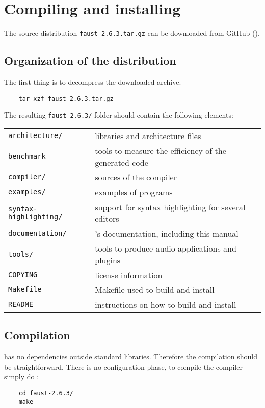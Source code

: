 \chapter{Compiling and installing \faust}

The \faust source distribution \lstinline'faust-2.6.3.tar.gz' can be downloaded from GitHub ().

\section{Organization of the distribution}
The first thing is to decompress the downloaded archive. 
\begin{lstlisting}
	tar xzf faust-2.6.3.tar.gz
\end{lstlisting}

The resulting  \lstinline'faust-2.6.3/' folder should contain the following elements:

\begin{tabular}{ll}
	\lstinline'architecture/' 		&\faust libraries and architecture files\\
	\lstinline'benchmark'			&tools to measure the efficiency of the generated code\\
	\lstinline'compiler/'			&sources of the \faust compiler\\
	\lstinline'examples/'			&examples of \faust programs\\
	\lstinline'syntax-highlighting/'&	support for syntax highlighting for several editors\\
	\lstinline'documentation/' 		&\faust's documentation, including this manual\\
	\lstinline'tools/'				&tools to produce audio applications and plugins\\
	\lstinline'COPYING'			&license information\\
	\lstinline'Makefile'			&Makefile used to build and install \faust\\
	\lstinline'README'			&instructions on how to build and install \faust
\end{tabular}

\section{Compilation}
\faust has no dependencies outside standard libraries. Therefore the compilation should be straightforward. There is no configuration phase, to compile the \faust compiler simply do :
\begin{lstlisting}
	cd faust-2.6.3/
	make
\end{lstlisting}


